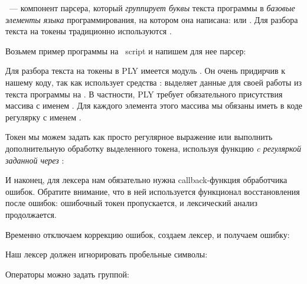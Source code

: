 \clearpage
{}

\ --- компонент парсера, который
\emph{группирует буквы} текста программы в \emph{базовые элементы языка} программирования, на
котором она написана:  или
. Для разбора текста на токены традиционно
используются .


\pagebreak
Возьмем пример программы на \bi\ script и напишем для нее парсер:
\pagebreak

Для разбора текста на токены в PLY имеется модуль .
Он очень придирчив к нашему коду, так как использует средства
: выделяет данные для своей работы из текста программы на
\py. В частности, PLY требует обязательного присутствия массива с именем
. Для каждого элемента этого массива мы обязаны иметь в коде
регулярку с именем .


\clearpage
Токен мы можем задать как просто регулярное выражение
или выполнить дополнительную обработку выделенного токена, используя функцию
\emph{c регуляркой заданной через }:

\clearpage
И наконец, для лексера нам обязательно нужна callback-функция обработчика
ошибок. Обратите внимание, что в ней используется функционал восстановления
после ошибок: ошибочный токен пропускается, и лексический анализ продолжается. 

\clearpage
Временно отключаем коррекцию ошибок, создаем лексер, и получаем ошибку:

\clearpage
{}

Наш лексер должен игнорировать пробельные символы:

Операторы можно задать группой:

